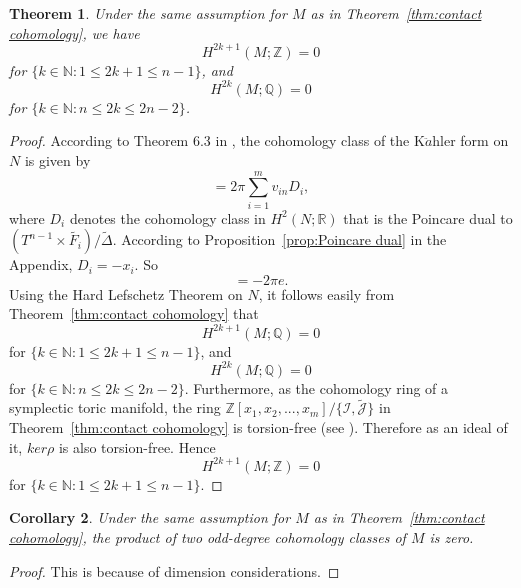\documentclass[12pt]{amsart}
\newtheorem{theorem}{Theorem}[section]
\newtheorem{corollary}[theorem]{Corollary}
\theoremstyle{definition}
\numberwithin{equation}{section}
\begin{document}
\begin{theorem}\label{thm:vanishing odd}Under the same assumption
for  $M$ as in Theorem~\ref{thm:contact cohomology}, we have
\begin{equation}H^{2k+1}(M;{{\mathbb{Z}}})=0
\end{equation}
for $\{k\in {{\mathbb{N}}}: 1\leq 2k+1\leq n-1\}$, and
\begin{equation}
H^{2k}(M;{{\mathbb{Q}}})=0
\end{equation}
for $\{k\in {{\mathbb{N}}}:n\leq 2k\leq 2n-2\}$.
\end{theorem}
\begin{proof}
According to Theorem 6.3 in \cite{Guillemin:Kaehler form}, the
cohomology class of the K$\ddot{a}$hler form on $N$ is given by
\begin{equation}
[\omega]=2\pi\sum_{i=1}^{m}v_{in}D_{i},
\end{equation}
where $D_{i}$ denotes the cohomology class in $H^{2}(N;{{\mathbb{R}}})$ that is
the Poincare dual to $(T^{n-1}\times \tilde{F_{i}})/\tilde{\Delta}$.
According to Proposition~\ref{prop:Poincare dual} in the Appendix,
$D_{i}=-x_{i}$. So
\begin{equation}
[\omega]=-2\pi e.
\end{equation}
Using the Hard Lefschetz Theorem on $N$, it follows easily from
Theorem~\ref{thm:contact cohomology} that
\begin{equation}H^{2k+1}(M;{{\mathbb{Q}}})=0
\end{equation}
for $\{k\in {{\mathbb{N}}}: 1\leq 2k+1\leq n-1\}$, and
\begin{equation}
H^{2k}(M;{{\mathbb{Q}}})=0
\end{equation}
for $\{k\in {{\mathbb{N}}}:n\leq 2k\leq 2n-2\}$. Furthermore, as the cohomology
ring of a symplectic toric manifold, the ring
${{\mathbb{Z}}}[x_{1},x_{2},...,x_{m}]/\{{{\mathcal{I}}},\tilde{{\mathcal{J}}}\}$ in
Theorem~\ref{thm:contact cohomology} is torsion-free (see
\cite{toric variety}). Therefore as an ideal of it, $ker\rho$ is
also torsion-free. Hence
\begin{equation}H^{2k+1}(M;{{\mathbb{Z}}})=0
\end{equation}
for $\{k\in {{\mathbb{N}}}: 1\leq 2k+1\leq n-1\}$.
\end{proof}

\begin{corollary}\label{cor:trivial between odd}
Under the same assumption for $M$ as in Theorem~\ref{thm:contact
cohomology}, the product of two odd-degree cohomology classes of $M$
is zero.
\end{corollary}
\begin{proof}
This is because of dimension considerations.
\end{proof}
\end{document}
